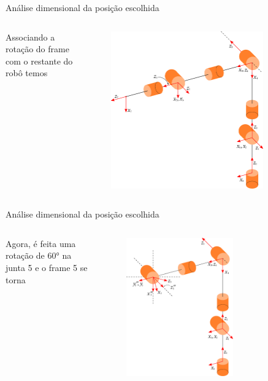 \documentclass[aspectratio=169]{beamer}
\begin{document}
\begin{frame}{Análise dimensional da posição escolhida}
\begin{columns}
Associando a rotação do frame com o restante do robô temos
\begin{figure}
    \centering
    \includegraphics[width=0.85\textwidth,right]{Fig/val_b.eps}
\end{figure}
\end{columns}
\end{frame}

\begin{frame}{Análise dimensional da posição escolhida}
\begin{columns}
Agora, é feita uma rotação de \ang{60} na junta 5 e o frame 5 se torna

\begin{figure}
    \centering
    \includegraphics[width=0.65\textwidth,right]{Fig/val_c.eps}
\end{figure}
\end{columns}
\end{frame}
\end{document}

